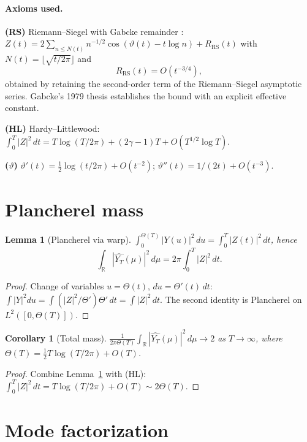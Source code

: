 \documentclass[11pt]{article}
\newtheorem{lemma}[theorem]{Lemma}
\newtheorem{corollary}[theorem]{Corollary}
\theoremstyle{definition}
\newcommand{\R}{\mathbb{R}}
\begin{document}
\paragraph{Axioms used.}

\textbf{(RS)} Riemann--Siegel with Gabcke remainder \cite{Gabcke}: $Z(t) = 2\sum_{n \leq N(t)} n^{-1/2}\cos(\vartheta(t) - t\log n) + R_{\mathrm{RS}}(t)$ with $N(t) = \lfloor\sqrt{t/2\pi}\rfloor$ and
\[
R_{\mathrm{RS}}(t) = O(t^{-3/4}),
\]
obtained by retaining the second-order term of the Riemann--Siegel asymptotic series. Gabcke's 1979 thesis establishes the bound with an explicit effective constant.

\textbf{(HL)} Hardy--Littlewood: $\int_0^T|Z|^2\,dt = T\log(T/2\pi) + (2\gamma - 1)T + O(T^{1/2}\log T)$.

\textbf{($\vartheta$)} $\vartheta'(t) = \tfrac12\log(t/2\pi) + O(t^{-2})$; $\vartheta''(t) = 1/(2t) + O(t^{-3})$.

\section{Plancherel mass}

\begin{lemma}[Plancherel via warp]\label{lem:plancherel}
$\displaystyle\int_0^{\Theta(T)}|Y(u)|^2\,du = \int_0^T|Z(t)|^2\,dt$, hence
\[
\int_\R |\widehat{Y_T}(\mu)|^2\,d\mu = 2\pi \int_0^T|Z|^2\,dt.
\]
\end{lemma}

\begin{proof}
Change of variables $u = \Theta(t)$, $du = \Theta'(t)\,dt$: $\int|Y|^2 du = \int (|Z|^2/\Theta')\Theta'\,dt = \int|Z|^2\,dt$. The second identity is Plancherel on $L^2([0,\Theta(T)])$.
\end{proof}

\begin{corollary}[Total mass]\label{cor:mass}
$\displaystyle\frac{1}{2\pi\Theta(T)}\int_\R |\widehat{Y_T}(\mu)|^2\,d\mu \longrightarrow 2$ as $T \to \infty$, where $\Theta(T) = \tfrac12 T\log(T/2\pi) + O(T)$.
\end{corollary}

\begin{proof}
Combine Lemma~\ref{lem:plancherel} with (HL): $\int_0^T|Z|^2\,dt = T\log(T/2\pi) + O(T) \sim 2\Theta(T)$.
\end{proof}

\section{Mode factorization}
\end{document}
